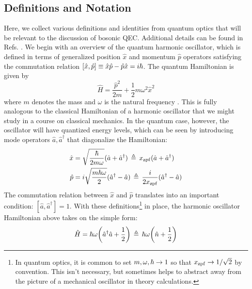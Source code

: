 \subsection{Definitions and Notation \label{sec:2_BosonicQEC_Definitions}}
Here, we collect various definitions and identities from quantum optics that will be relevant to the discussion of bosonic QEC. Additional details can be found in Refs. \cite{shankar1994principles, raimond2006exploring, grynberg2010introduction}. We begin with an overview of the quantum harmonic oscillator, which is defined in terms of generalized position $\hat{x}$ and momentum $\hat{p}$ operators satisfying the commutation relation $[\hat{x}, \hat{p}] \equiv \hat{x}\hat{p} - \hat{p}\hat{x} = i\hbar$. The quantum Hamiltonian is given by
\begin{equation}
    \hat{H} = \frac{\hat{p}^2}{2m} + \frac{1}{2}m\omega^2 \hat{x}^2
\end{equation}
where $m$ denotes the mass and $\omega$ is the natural frequency \cite{shankar1994principles}. This is fully analogous to the classical Hamiltonian of a harmonic oscillator that we might study in a course on classical mechanics. In the quantum case, however, the oscillator will have quantized energy levels, which can be seen by introducing mode operators $\hat{a}, \hat{a}^\dagger$ that diagonalize the Hamiltonian:
\begin{align}
\begin{split}
     \hat{x} &= \sqrt{\frac{\hbar}{2m\omega}}(\hat{a} + \hat{a}^\dagger) \,\triangleq\, x_{\rm zpf} (\hat{a} + \hat{a}^\dagger) \\
     \hat{p} &= i\sqrt{\frac{m\hbar\omega}{2}}(\hat{a}^\dagger - \hat{a}) \,\triangleq\, \frac{i}{2x_{\rm zpf}} (\hat{a}^\dagger - \hat{a})
\end{split}
\end{align}
The commutation relation between $\hat{x}$ and $\hat{p}$ translates into an important condition: $[\hat{a}, \hat{a}^\dagger] = 1$. With these definitions\footnote{In quantum optics, it is common to set $m, \omega, \hbar \to 1$ so that $x_{\rm zpf} \to 1/\sqrt{2}$ by convention. This isn't necessary, but sometimes helps to abstract away from the picture of a mechanical oscillator in theory calculations.} in place, the harmonic oscillator Hamiltonian above takes on the simple form: 
\begin{equation}
    \hat{H} = \hbar\omega\bigg(\hat{a}^\dagger\hat{a} + \frac{1}{2}\bigg) \,\triangleq\, \hbar\omega\bigg(\hat{n} + \frac{1}{2}\bigg)
\end{equation}
